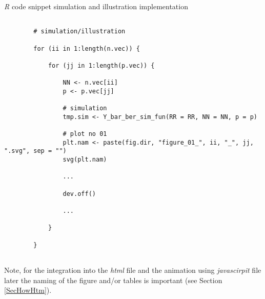 \documentclass[12pt]{article}
\begin{document}
\begin{CodeSnippet}[!hp]
	\centering
	\caption{\emph{R} code snippet simulation and illustration implementation}
	\scriptsize
	\vspace{0.25cm}
	\begin{BVerbatim}
		
		# simulation/illustration
		
		for (ii in 1:length(n.vec)) {
			
			for (jj in 1:length(p.vec)) {
				
				NN <- n.vec[ii]
				p <- p.vec[jj]
				
				# simulation
				tmp.sim <- Y_bar_ber_sim_fun(RR = RR, NN = NN, p = p)
								
				# plot no 01
				plt.nam <- paste(fig.dir, "figure_01_", ii, "_", jj, ".svg", sep = "")
				svg(plt.nam) 
				
				...
				
				dev.off()		
				
				...
				
			}
			
		}
		
	\end{BVerbatim}
	\label{RCodSniSimImp}
\end{CodeSnippet}
%
Note, for the integration into the \emph{html} file and the animation using \emph{javascirpit} file later the naming of the figure and/or tables is important (see Section \ref{SecHowHtm}).

%
\end{document}
